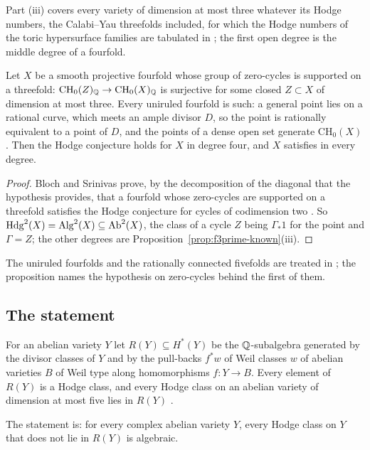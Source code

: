 Part (iii) covers every variety of dimension at most three whatever its Hodge numbers, the Calabi--Yau threefolds included, for which the Hodge numbers of the toric hypersurface families are tabulated in \cite{Bha26a}; the first open degree is the middle degree of a fourfold.

\begin{proposition}\label{prop:fourfold}
Let $X$ be a smooth projective fourfold whose group of zero-cycles is supported on a threefold: $\mathrm{CH}_{0}(Z)_{\mathbb{Q}}\to\mathrm{CH}_{0}(X)_{\mathbb{Q}}$ is surjective for some closed $Z\subset X$ of dimension at most three. Every uniruled fourfold is such: a general point lies on a rational curve, which meets an ample divisor $D$, so the point is rationally equivalent to a point of $D$, and the points of a dense open set generate $\mathrm{CH}_{0}(X)$. Then the Hodge conjecture holds for $X$ in degree four, and $X$ satisfies \Fiii{} in every degree.
\end{proposition}

\begin{proof}
Bloch and Srinivas prove, by the decomposition of the diagonal that the hypothesis provides, that a fourfold whose zero-cycles are supported on a threefold satisfies the Hodge conjecture for cycles of codimension two \cite[Thm.~1]{BS83}. So $\mathrm{Hdg}^{2}(X)=\mathrm{Alg}^{2}(X)\subseteq\mathrm{Ab}^{2}(X)$, the class of a cycle $Z$ being $\Gamma_{*}1$ for the point and $\Gamma=Z$; the other degrees are Proposition~\ref{prop:f3prime-known}(iii).
\end{proof}

The uniruled fourfolds and the rationally connected fivefolds are treated in \cite{BMB26}; the proposition names the hypothesis on zero-cycles behind the first of them.


\subsection{The statement \Fii{}}

For an abelian variety $Y$ let $R(Y)\subseteq H^{*}(Y)$ be the $\mathbb{Q}$-subalgebra generated by the divisor classes of $Y$ and by the pull-backs $f^{*}w$ of Weil classes $w$ of abelian varieties $B$ of Weil type along homomorphisms $f\colon Y\to B$. Every element of $R(Y)$ is a Hodge class, and every Hodge class on an abelian variety of dimension at most five lies in $R(Y)$ \cite{MZ99}.

\begin{definition}\label{def:f2}
The statement \Fii{} is: for every complex abelian variety $Y$, every Hodge class on $Y$ that does not lie in $R(Y)$ is algebraic.
\end{definition}

